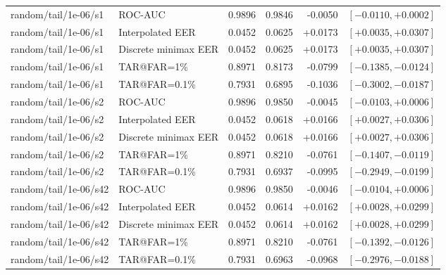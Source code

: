 \begin{table}[!t]
\begin{tabular}{@{}llrrrr@{}}
random/tail/1e-06/s1 & ROC-AUC & 0.9896 & 0.9846 & -0.0050 & $[-0.0110,+0.0002]$ \\
random/tail/1e-06/s1 & Interpolated EER & 0.0452 & 0.0625 & +0.0173 & $[+0.0035,+0.0307]$ \\
random/tail/1e-06/s1 & Discrete minimax EER & 0.0452 & 0.0625 & +0.0173 & $[+0.0035,+0.0307]$ \\
random/tail/1e-06/s1 & TAR@FAR=1\% & 0.8971 & 0.8173 & -0.0799 & $[-0.1385,-0.0124]$ \\
random/tail/1e-06/s1 & TAR@FAR=0.1\% & 0.7931 & 0.6895 & -0.1036 & $[-0.3002,-0.0187]$ \\
random/tail/1e-06/s2 & ROC-AUC & 0.9896 & 0.9850 & -0.0045 & $[-0.0103,+0.0006]$ \\
random/tail/1e-06/s2 & Interpolated EER & 0.0452 & 0.0618 & +0.0166 & $[+0.0027,+0.0306]$ \\
random/tail/1e-06/s2 & Discrete minimax EER & 0.0452 & 0.0618 & +0.0166 & $[+0.0027,+0.0306]$ \\
random/tail/1e-06/s2 & TAR@FAR=1\% & 0.8971 & 0.8210 & -0.0761 & $[-0.1407,-0.0119]$ \\
random/tail/1e-06/s2 & TAR@FAR=0.1\% & 0.7931 & 0.6937 & -0.0995 & $[-0.2949,-0.0199]$ \\
random/tail/1e-06/s42 & ROC-AUC & 0.9896 & 0.9850 & -0.0046 & $[-0.0104,+0.0006]$ \\
random/tail/1e-06/s42 & Interpolated EER & 0.0452 & 0.0614 & +0.0162 & $[+0.0028,+0.0299]$ \\
random/tail/1e-06/s42 & Discrete minimax EER & 0.0452 & 0.0614 & +0.0162 & $[+0.0028,+0.0299]$ \\
random/tail/1e-06/s42 & TAR@FAR=1\% & 0.8971 & 0.8210 & -0.0761 & $[-0.1392,-0.0126]$ \\
random/tail/1e-06/s42 & TAR@FAR=0.1\% & 0.7931 & 0.6963 & -0.0968 & $[-0.2976,-0.0188]$ \\
\bottomrule
\end{tabular}
\end{table}
